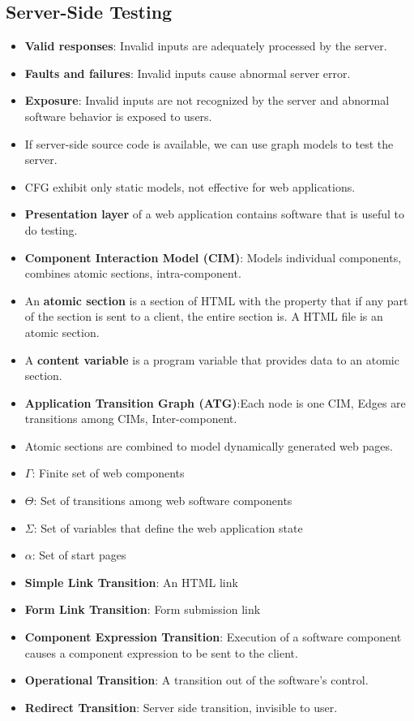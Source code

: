 \documentclass[a4paper]{article}
\begin{document}
\subsection{Server-Side Testing}
\begin{itemize}
    \item \textbf{Valid responses}: Invalid inputs are adequately processed by the server.
    \item \textbf{Faults and failures}: Invalid inputs cause abnormal server error.
    \item \textbf{Exposure}: Invalid inputs are not recognized by the server and abnormal software behavior is exposed to users.
    \item If server-side source code is available, we can use graph models to test the server.
    \item CFG exhibit only static models, not effective for web applications.
    \item \textbf{Presentation layer} of a web application contains software that is useful to do testing.
    \item \textbf{Component Interaction Model (CIM)}: Models individual components, combines atomic sections, intra-component.
    \item An \textbf{atomic section} is a section of HTML with the property that if any part of the section is sent to a client, the entire section is. A HTML file is an atomic section.
    \item A \textbf{content variable} is a program variable that provides data to an atomic section.
    \item \textbf{Application Transition Graph (ATG)}:Each node is one CIM, Edges are transitions among CIMs, Inter-component.
    \item Atomic sections are combined to model dynamically generated web pages.
    \item $\Gamma$: Finite set of web components
    \item $\Theta$: Set of transitions among web software components
    \item $\Sigma$: Set of variables that define the web application state
    \item $\alpha$: Set of start pages
    \item \textbf{Simple Link Transition}: An HTML link
    \item \textbf{Form Link Transition}: Form submission link
    \item \textbf{Component Expression Transition}: Execution of a software component causes a component expression to be sent to the client.
    \item \textbf{Operational Transition}: A transition out of the software's control.
    \item \textbf{Redirect Transition}: Server side transition, invisible to user.
\end{itemize}
\pagebreak
\end{document}
